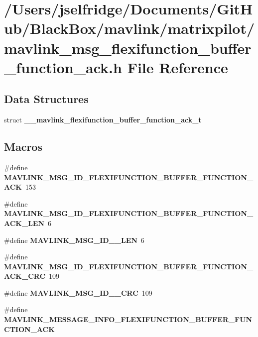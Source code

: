 \section{/\+Users/jselfridge/\+Documents/\+Git\+Hub/\+Black\+Box/mavlink/matrixpilot/mavlink\+\_\+msg\+\_\+flexifunction\+\_\+buffer\+\_\+function\+\_\+ack.h File Reference}
\label{mavlink__msg__flexifunction__buffer__function__ack_8h}
\subsection*{Data Structures}
\begin{DoxyCompactItemize}
\item 
struct \textbf{ \+\_\+\+\_\+mavlink\+\_\+flexifunction\+\_\+buffer\+\_\+function\+\_\+ack\+\_\+t}
\end{DoxyCompactItemize}
\subsection*{Macros}
\begin{DoxyCompactItemize}
\item 
\#define \textbf{ M\+A\+V\+L\+I\+N\+K\+\_\+\+M\+S\+G\+\_\+\+I\+D\+\_\+\+F\+L\+E\+X\+I\+F\+U\+N\+C\+T\+I\+O\+N\+\_\+\+B\+U\+F\+F\+E\+R\+\_\+\+F\+U\+N\+C\+T\+I\+O\+N\+\_\+\+A\+CK}~153
\item 
\#define \textbf{ M\+A\+V\+L\+I\+N\+K\+\_\+\+M\+S\+G\+\_\+\+I\+D\+\_\+\+F\+L\+E\+X\+I\+F\+U\+N\+C\+T\+I\+O\+N\+\_\+\+B\+U\+F\+F\+E\+R\+\_\+\+F\+U\+N\+C\+T\+I\+O\+N\+\_\+\+A\+C\+K\+\_\+\+L\+EN}~6
\item 
\#define \textbf{ M\+A\+V\+L\+I\+N\+K\+\_\+\+M\+S\+G\+\_\+\+I\+D\+\_\+\_\+\+L\+EN}~6
\item 
\#define \textbf{ M\+A\+V\+L\+I\+N\+K\+\_\+\+M\+S\+G\+\_\+\+I\+D\+\_\+\+F\+L\+E\+X\+I\+F\+U\+N\+C\+T\+I\+O\+N\+\_\+\+B\+U\+F\+F\+E\+R\+\_\+\+F\+U\+N\+C\+T\+I\+O\+N\+\_\+\+A\+C\+K\+\_\+\+C\+RC}~109
\item 
\#define \textbf{ M\+A\+V\+L\+I\+N\+K\+\_\+\+M\+S\+G\+\_\+\+I\+D\+\_\+\_\+\+C\+RC}~109
\item 
\#define \textbf{ M\+A\+V\+L\+I\+N\+K\+\_\+\+M\+E\+S\+S\+A\+G\+E\+\_\+\+I\+N\+F\+O\+\_\+\+F\+L\+E\+X\+I\+F\+U\+N\+C\+T\+I\+O\+N\+\_\+\+B\+U\+F\+F\+E\+R\+\_\+\+F\+U\+N\+C\+T\+I\+O\+N\+\_\+\+A\+CK}
\end{DoxyCompactItemize}
